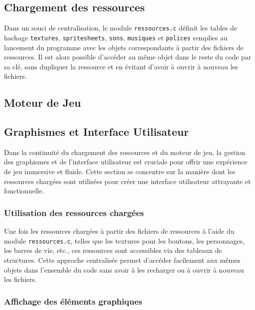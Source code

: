 \documentclass[a4paper,12pt]{article}
\begin{document}
\subsection{Chargement des ressources}

Dans un souci de centralisation, le module \texttt{ressources.c} définit les tables de hachage \texttt{textures}, \texttt{spritesheets}, \texttt{sons}, \texttt{musiques} et \texttt{polices} remplies au lancement du programme avec les objets correspondants à partir des fichiers de ressources.
Il est alors possible d’accéder au même objet dans le reste du code par sa clé, sans dupliquer la ressource et en évitant d’avoir à ouvrir à nouveau les fichiers.


\subsection{Moteur de Jeu}

\subsection{Graphismes et Interface Utilisateur} %

Dans la continuité du chargement des ressources et du moteur de jeu, la gestion des graphismes et de l'interface utilisateur est cruciale pour offrir une expérience de jeu immersive et fluide. Cette section se concentre sur la manière dont les ressources chargées sont utilisées pour créer une interface utilisateur attrayante et fonctionnelle.

\subsubsection{Utilisation des ressources chargées}

Une fois les ressources chargées à partir des fichiers de ressources à l'aide du module \texttt{ressources.c}, telles que les textures pour les boutons, les personnages, les barres de vie, etc., ces ressources sont accessibles via des tableaux de structures. Cette approche centralisée permet d'accéder facilement aux mêmes objets dans l'ensemble du code sans avoir à les recharger ou à ouvrir à nouveau les fichiers.

\subsubsection{Affichage des éléments graphiques}
\end{document}
